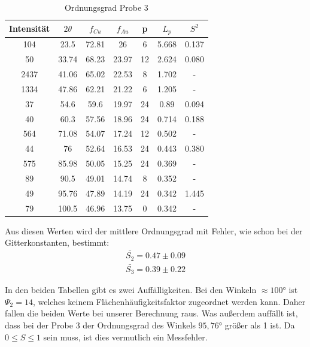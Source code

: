                 \begin{table}[H]
                    \centering
                    \begin{tabular}{c | c | c | c | c | c | c}
                        Intensität & $2\theta$ & $f_{Cu}$ & $f_{Au}$ & p & $L_p$ & $S^2$\\
                        \hline
                        104 & 23.5 & 72.81 & 26 & 6 & 5.668 & 0.137\\
                        50 & 33.74 & 68.23 & 23.97 & 12 & 2.624 & 0.080\\
                        2437 & 41.06 & 65.02 & 22.53 & 8 & 1.702 & - \\
                        1334 & 47.86 & 62.21 & 21.22 & 6 & 1.205 & - \\
                        37 & 54.6 & 59.6 & 19.97 & 24 & 0.89 & 0.094\\
                        40 & 60.3 & 57.56 & 18.96 & 24 & 0.714 & 0.188\\
                        564 & 71.08 & 54.07 & 17.24 & 12 & 0.502 & - \\
                        44 & 76 & 52.64 & 16.53 & 24 & 0.443 & 0.380\\
                        575 & 85.98 & 50.05 & 15.25 & 24 & 0.369 &  -\\
                        89 & 90.5 & 49.01 & 14.74 & 8 & 0.352 &  -\\
                        49 & 95.76 & 47.89 & 14.19 & 24 & 0.342 & 1.445\\
                        79 & 100.5 & 46.96 & 13.75 & 0 & 0.342 & - \\
                    \end{tabular}
                    \caption{Ordnungsgrad Probe 3}
                \end{table}

                Aus diesen Werten wird der mittlere Ordnungsgrad mit Fehler, wie schon bei der Gitterkonstanten, 
                bestimmt:
                \begin{align}
                    \bar{S_2} = 0.47 \pm 0.09\\
                    \bar{S_3} = 0.39 \pm 0.22
                \end{align}

                In den beiden Tabellen gibt es zwei Auffälligkeiten. Bei den Winkeln $\approx 100$°
                ist $\Psi_2 = 14$, welches keinem Flächenhäufigkeitsfaktor zugeordnet werden kann. Daher fallen
                die beiden Werte bei unserer Berechnung raus. Was außerdem auffällt ist, dass bei der Probe 3 
                der Ordnungsgrad des Winkels $95,76$° größer als 1 ist. Da $0 \leq S \leq 1$ sein muss, ist dies 
                vermutlich ein Messfehler.
            


